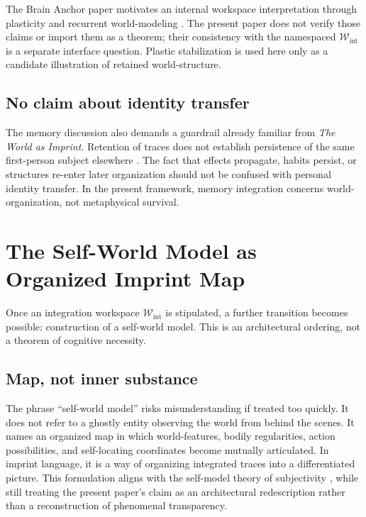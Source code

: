 \documentclass[12pt,a4paper]{article}
\begin{document}
The Brain Anchor paper motivates an internal workspace interpretation
through plasticity and recurrent world-modeling \cite{BrainAnchor}. The
present paper does not verify those claims or import them as a theorem;
their consistency with the namespaced \(\mathcal W_{\mathrm{int}}\) is a
separate interface question. Plastic stabilization is used here only as
a candidate illustration of retained world-structure.

\subsection{No claim about identity transfer}

The memory discussion also demands a guardrail already familiar from \emph{The World as Imprint}. Retention of traces does not establish persistence of the same first-person subject elsewhere \cite{WorldImprint}. The fact that effects propagate, habits persist, or structures re-enter later organization should not be confused with personal identity transfer. In the present framework, memory integration concerns world-organization, not metaphysical survival.

\section{The Self-World Model as Organized Imprint Map}

Once an integration workspace \(\mathcal W_{\mathrm{int}}\) is
stipulated, a further transition becomes possible: construction of a
self-world model. This is an architectural ordering, not a theorem of
cognitive necessity.

\subsection{Map, not inner substance}

The phrase ``self-world model'' risks misunderstanding if treated too quickly. It does not refer to a ghostly entity observing the world from behind the scenes. It names an organized map in which world-features, bodily regularities, action possibilities, and self-locating coordinates become mutually articulated. In imprint language, it is a way of organizing integrated traces into a differentiated picture. This formulation aligns with the self-model theory of subjectivity \cite{Metzinger2003}, while still treating the present paper's claim as an architectural redescription rather than a reconstruction of phenomenal transparency.
\end{document}
